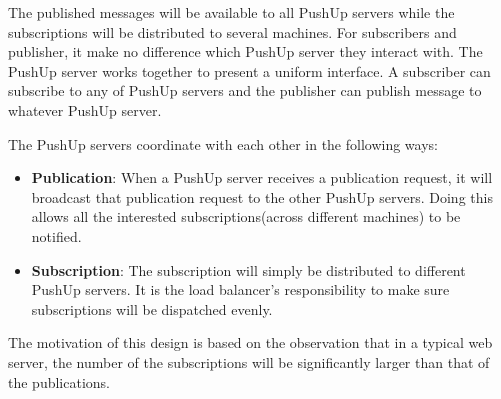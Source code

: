 The published messages will be available to all PushUp servers while the
subscriptions will be distributed to several machines. For 
subscribers and publisher, it make no difference which PushUp server they interact 
with.  The PushUp server works together to present
a uniform interface. A subscriber can subscribe to any of PushUp 
servers and the publisher can publish message to whatever PushUp server. 

The PushUp servers coordinate with each other in the following ways:

\begin{itemize}
    \item {\bf Publication}: When a PushUp server receives a publication request, it
          will broadcast that publication request to the other PushUp servers. Doing
          this allows all the interested subscriptions(across different machines) to 
          be notified.
    \item {\bf Subscription}: The subscription will simply be distributed to different
          PushUp servers. It is the load balancer's responsibility to make sure 
          subscriptions will be dispatched evenly.
\end{itemize}

The motivation of this design is based on the observation that in a typical web server,
the number of the subscriptions will be significantly larger than that of the publications.

